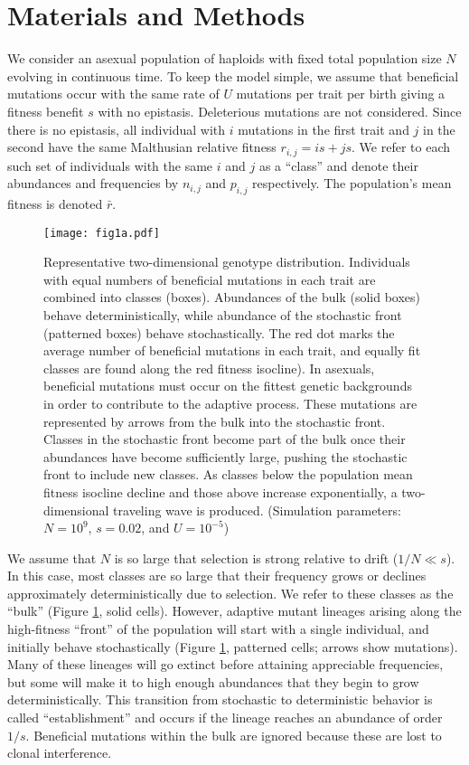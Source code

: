\documentclass[9pt,twocolumn,twoside]{gsajnl}
\begin{document}
\section{Materials and Methods}
\label{sec:materials:methods}
We consider an asexual population of haploids with fixed total population size $N$ evolving in continuous time. To keep the model simple, we assume that beneficial mutations occur with the same rate of $U$ mutations per trait per birth giving a fitness benefit $s$ with no epistasis. Deleterious mutations are not considered. Since there is no epistasis, all individual with $i$ mutations in the first trait and $j$ in the second have the same Malthusian relative fitness $r_{i,j}= i s+j s$. We refer to each such set of individuals with the same $i$ and $j$ as a ``class'' and denote their abundances and frequencies by $n_{i,j}$ and $p_{i,j}$ respectively. The population's mean fitness is denoted $\bar{r}$.

\begin{figure}[!ht]
\texttt{[image: fig1a.pdf]}
\caption{Representative two-dimensional genotype distribution. Individuals with equal numbers of beneficial mutations in each trait are combined into classes (boxes). Abundances of the bulk (solid boxes) behave deterministically, while abundance of the stochastic front (patterned boxes) behave stochastically. The red dot marks the average number of beneficial mutations in each trait, and equally fit classes are found along the red fitness isocline). In asexuals, beneficial mutations must occur on the fittest genetic backgrounds in order to contribute to the adaptive process. These mutations are represented by arrows from the bulk into the stochastic front. Classes in the stochastic front become part of the bulk once their abundances have become sufficiently large, pushing the stochastic front to include new classes. As classes below the population mean fitness isocline decline and those above increase exponentially, a two-dimensional traveling wave is produced. (Simulation parameters: $N=10^9$, $s=0.02$, and $U=10^{-5}$)}\label{fig:1}
\end{figure}

We assume that $N$ is so large that selection is strong relative to drift ($1/N \ll s$). In this case, most classes are so large that their frequency grows or declines approximately deterministically due to selection. We refer to these classes as the ``bulk''  (Figure \ref{fig:1}, solid cells). However, adaptive mutant lineages arising along the high-fitness ``front'' of the population will start with a single individual, and initially behave stochastically (Figure \ref{fig:1}, patterned cells; arrows show mutations). Many of these lineages will go extinct before attaining appreciable frequencies, but some will make it to high enough abundances that they begin to grow deterministically. This transition from stochastic to deterministic behavior is called ``establishment'' and occurs if the lineage reaches an abundance of order $1/s$. Beneficial mutations within the bulk are ignored because these are lost to clonal interference. 
\end{document}
